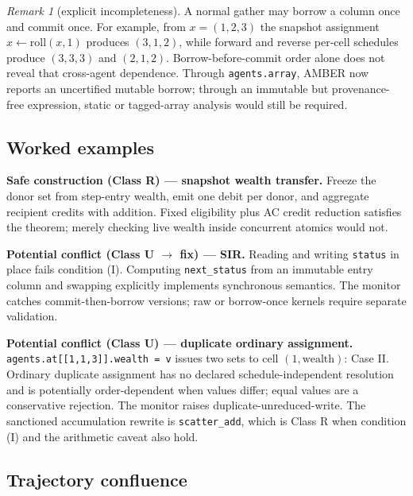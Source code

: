 \documentclass[sigconf,nonacm,review,natbib=true]{acmart}
\theoremstyle{definition}
\theoremstyle{plain}
\theoremstyle{remark}
\newtheorem{remark}{Remark}
\begin{document}
\begin{remark}[explicit incompleteness]
A normal gather may borrow a column once and commit once. For example, from
$x=(1,2,3)$ the snapshot assignment $x\leftarrow\mathrm{roll}(x,1)$ produces
$(3,1,2)$, while forward and reverse per-cell schedules produce $(3,3,3)$ and
$(2,1,2)$. Borrow-before-commit order alone does not reveal that cross-agent
dependence. Through \texttt{agents.array}, AMBER now reports an uncertified
mutable borrow; through an immutable but provenance-free expression, static or
tagged-array analysis would still be required.
\end{remark}
 
\subsection{Worked examples}\label{ax:examples}

\textbf{Safe construction (Class R) --- snapshot wealth transfer.} Freeze the
donor set from step-entry wealth, emit one debit per donor, and aggregate
recipient credits with addition. Fixed eligibility plus AC credit reduction
satisfies the theorem; merely checking live wealth inside concurrent atomics
would not.

\textbf{Potential conflict (Class U $\rightarrow$ fix) --- SIR.} Reading and
writing \texttt{status} in place fails condition (I). Computing
\texttt{next\_status} from an immutable entry column and swapping explicitly
implements synchronous semantics. The monitor catches commit-then-borrow
versions; raw or borrow-once kernels require separate validation.

\textbf{Potential conflict (Class U) --- duplicate ordinary assignment.} \texttt{agents.\allowbreak{}at[\allowbreak{}[\allowbreak{}1,1,3]\allowbreak{}]\allowbreak{}.\allowbreak{}wealth =\allowbreak{} v} issues two \textsf{set}s to cell $(1,\text{wealth})$: Case II. Ordinary duplicate assignment has no declared schedule-independent resolution and is potentially order-dependent when values differ; equal values are a conservative rejection. The monitor raises duplicate-unreduced-write. The sanctioned accumulation rewrite is \texttt{scatter\_add}, which is Class R when condition (I) and the arithmetic caveat also hold.


\subsection{Trajectory confluence}\label{ax:conf}
\end{document}
